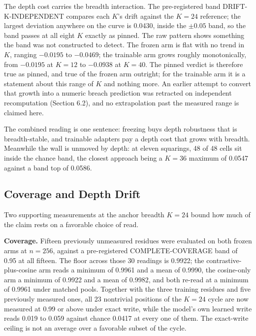 The depth cost carries the breadth interaction. The pre-registered band
DRIFT-K-INDEPENDENT compares each $K$'s drift against the $K{=}24$
reference; the largest deviation anywhere on the curve is 0.0430, inside
the $\pm 0.05$ band, so the band passes at all eight $K$ exactly as
pinned. The raw pattern shows something the band was not constructed to
detect. The frozen arm is flat with no trend in $K$, ranging $-0.0195$
to $-0.0469$; the trainable arm grows roughly monotonically, from
$-0.0195$ at $K{=}12$ to $-0.0938$ at $K{=}40$. The pinned verdict is
therefore true as pinned, and true of the frozen arm outright; for the
trainable arm it is a statement about this range of $K$ and nothing
more. An earlier attempt to convert that growth into a numeric breach
prediction was retracted on independent recomputation (Section 6.2), and
no extrapolation past the measured range is claimed here.

The combined reading is one sentence: freezing buys depth robustness
that is breadth-stable, and trainable adapters pay a depth cost that
grows with breadth. Meanwhile the wall is unmoved by depth: at eleven
squarings, 48 of 48 cells sit inside the chance band, the closest
approach being a $K{=}36$ maximum of 0.0547 against a band top of
0.0586.

\subsection{Coverage and Depth Drift}

Two supporting measurements at the anchor breadth $K{=}24$ bound how
much of the claim rests on a favorable choice of read.

\textbf{Coverage.} Fifteen previously unmeasured residues were evaluated on
both frozen arms at $n{=}256$, against a pre-registered
COMPLETE-COVERAGE band of 0.95 at all fifteen. The floor across those 30
readings is 0.9922; the contrastive-plus-cosine arm reads a minimum of
0.9961 and a mean of 0.9990, the cosine-only arm a minimum of 0.9922 and
a mean of 0.9982, and both re-read at a minimum of 0.9961 under matched
pools. Together with the three training residues and five previously
measured ones, all 23 nontrivial positions of the $K{=}24$ cycle are now
measured at 0.99 or above under exact write, while the model's own
learned write reads 0.019 to 0.059 against chance 0.0417 at every one of
them. The exact-write ceiling is not an average over a favorable subset
of the cycle.

